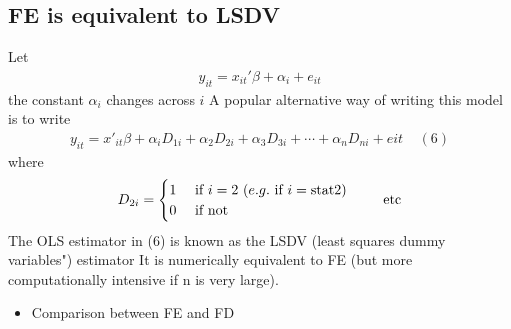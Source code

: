 \documentclass[a4paper,twoside,11pt]{article}
\begin{document}
\subsection{FE is equivalent to LSDV}
Let
\begin{equation*}
\begin{aligned}
y_{it} = x_{it}' \beta + \alpha_i + e_{it}
\end{aligned}
\end{equation*}
the constant $\alpha_i$ changes across $i$ 
\newline
\newline
A popular alternative way of writing this model is to write
\begin{equation*}
\begin{aligned}
y_{it} = x'_{it} \beta + \alpha_i D_{1i} + \alpha_2 D_{2i} + \alpha_3 D_{3i} + \cdots + \alpha_n D_{ni} + e{it} \ \ \ \ \ (6) 
\end{aligned}
\end{equation*}
where
\begin{equation*}
\begin{aligned}
D_{2i} = \begin{cases}
1 \ \ \ \ \textmd{if} \ i=2 \ (e.g.  \ \textmd{if} \ i = \textmd{stat} 2) \\ 
0 \ \ \ \ \textmd{if not}
\end{cases}
\ \ \ \ \textmd{etc}
\end{aligned}
\end{equation*}
The OLS estimator in (6) is known as the LSDV (least squares dummy variables") estimator
\newline
\textcolor{NavyBlue}{It is numerically equivalent to FE (but more computationally intensive if n is very large).}
\begin{itemize}
    \item Comparison between FE and FD
\end{itemize}
\end{document}
